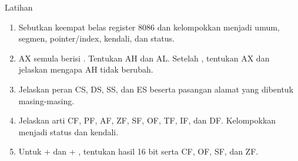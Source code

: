 \documentclass[aspectratio=169,11pt]{beamer}
\begin{document}
\begin{frame}{Latihan}
\small
\begin{enumerate}
    \item Sebutkan keempat belas register 8086 dan kelompokkan
          menjadi umum, segmen, pointer/index, kendali, dan status.

    \vspace{0.15em}
    \item AX semula berisi . Tentukan AH dan AL. Setelah
          , tentukan AX dan jelaskan mengapa AH
          tidak berubah.

    \vspace{0.15em}
    \item Jelaskan peran CS, DS, SS, dan ES beserta pasangan alamat
          yang dibentuk masing-masing.

    \vspace{0.15em}
    \item Jelaskan arti CF, PF, AF, ZF, SF, OF, TF, IF, dan DF.
          Kelompokkan menjadi  status dan kendali.

    \vspace{0.15em}
    \item Untuk  +  dan  + ,
          tentukan hasil 16 bit serta CF, OF, SF, dan ZF.
\end{enumerate}
\end{frame}
\end{document}
